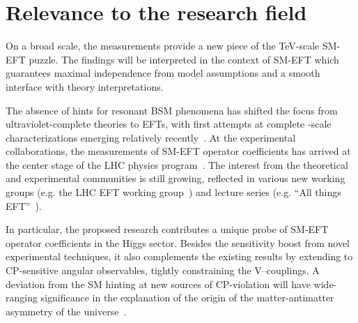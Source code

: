 \documentclass[a4paper,11pt]{article}
\renewcommand{\PV}{{{{V}}}\xspace}
\begin{document}
\section{Relevance to the research field}

On a broad scale, the measurements provide a new piece of the TeV-scale SM-EFT puzzle. 
The findings will be interpreted in the context of SM-EFT which guarantees maximal independence from model assumptions and a smooth interface with theory interpretations.  

The absence of hints for resonant BSM phenomena has shifted the focus from ultraviolet-complete theories to EFTs, with first attempts at complete \TeV-scale characterizations emerging relatively recently~\cite{Ellis:2018gqa,Ellis:2020unq,Ethier:2021bye}.
At the experimental collaborations, the measurements of SM-EFT operator coefficients has arrived at the center stage of the LHC physics program~\cite{CMS:2021nnc,CMS:2021aly,CMS:2021gme}.
The interest from the theoretical and experimental communities is still growing, reflected in various new working groups (e.g. the  LHC EFT working group~\cite{LHC_EFT_WG}) and lecture series (e.g. ``All things EFT''~\cite{All_EFT}).



In particular, the proposed research contributes a unique probe of SM-EFT operator coefficients in the Higgs sector.
Besides the sensitivity boost from novel experimental techniques, it also complements the existing results by extending to CP-sensitive angular observables, tightly constraining the \PV--\PH couplings.
A deviation from the SM hinting at new sources of CP-violation will have wide-ranging significance in the explanation of the origin of the matter-antimatter asymmetry of the universe~\cite{Cohen:1997ac,Damgaard:2015con,Grzadkowski:2018nbc}.


\end{document}
